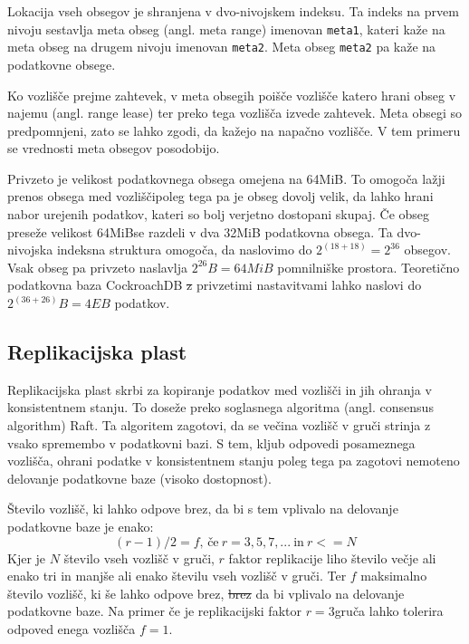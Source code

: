 \documentclass[a4paper, 12pt]{book}
\providecommand{\DIFaddtex}[1]{{\protect\color{blue}\uwave{#1}}} %
\providecommand{\DIFdeltex}[1]{{\protect\color{red}\sout{#1}}}                      %
\providecommand{\DIFaddbegin}{} %
\providecommand{\DIFaddend}{} %
\providecommand{\DIFdelbegin}{} %
\providecommand{\DIFdelend}{} %
\providecommand{\DIFadd}[1]{\texorpdfstring{\DIFaddtex{#1}}{#1}} %
\providecommand{\DIFdel}[1]{\texorpdfstring{\DIFdeltex{#1}}{}} %
\newcommand{\DIFscaledelfig}{0.5}
\newlength{\DIFdelgraphicswidth} %
\newlength{\DIFdelgraphicsheight} %
\newcommand{\DIFaddincludegraphics}[2][]{{\color{blue}\fbox{\DIFOincludegraphics[#1]{#2}}}} %
\newcommand{\DIFdelincludegraphics}[2][]{%
\sbox{\DIFdelgraphicsbox}{\DIFOincludegraphics[#1]{#2}}%
\settoboxwidth{\DIFdelgraphicswidth}{\DIFdelgraphicsbox} %
\settoboxtotalheight{\DIFdelgraphicsheight}{\DIFdelgraphicsbox} %
\scalebox{\DIFscaledelfig}{%
\parbox[b]{\DIFdelgraphicswidth}{\usebox{\DIFdelgraphicsbox}\\[-\baselineskip] \rule{\DIFdelgraphicswidth}{0em}}\llap{\resizebox{\DIFdelgraphicswidth}{\DIFdelgraphicsheight}{%
\setlength{\unitlength}{\DIFdelgraphicswidth}%
\begin{picture}(1,1)%
\thicklines\linethickness{2pt} %
{\color[rgb]{1,0,0}\put(0,0){\framebox(1,1){}}}%
{\color[rgb]{1,0,0}\put(0,0){\line( 1,1){1}}}%
{\color[rgb]{1,0,0}\put(0,1){\line(1,-1){1}}}%
\end{picture}%
}\hspace*{3pt}}} %
} %
\DeclareRobustCommand{\DIFaddbegin}{\DIFOaddbegin \let\includegraphics\DIFaddincludegraphics} %
\DeclareRobustCommand{\DIFaddend}{\DIFOaddend \let\includegraphics\DIFOincludegraphics} %
\DeclareRobustCommand{\DIFdelbegin}{\DIFOdelbegin \let\includegraphics\DIFdelincludegraphics} %
\DeclareRobustCommand{\DIFdelend}{\DIFOaddend \let\includegraphics\DIFOincludegraphics} %
\begin{document}
Lokacija vseh obsegov je shranjena v dvo-nivojskem indeksu. Ta indeks na prvem nivoju sestavlja meta obseg (angl. meta range) imenovan \texttt{meta1}, kateri kaže na meta obseg na drugem nivoju imenovan \texttt{meta2}. Meta obseg \texttt{meta2} pa kaže na podatkovne obsege.

Ko vozlišče prejme zahtevek, v meta obsegih poišče vozlišče katero hrani obseg v najemu (angl. range lease) ter preko tega vozlišča izvede zahtevek. Meta obsegi so predpomnjeni, zato se lahko zgodi, da kažejo na napačno vozlišče. V tem primeru se vrednosti meta obsegov posodobijo.

Privzeto je velikost podatkovnega obsega omejena na 64MiB. To omogoča lažji prenos obsega med vozlišči\DIFaddbegin \DIFadd{, }\DIFaddend poleg tega pa je obseg dovolj velik, da lahko hrani nabor urejenih podatkov, kateri so bolj verjetno dostopani skupaj. Če obseg preseže velikost 64MiB\DIFaddbegin \DIFadd{, }\DIFaddend se razdeli v dva 32MiB podatkovna obsega. Ta dvo-nivojska indeksna struktura omogoča, da naslovimo do \(2^{(18 + 18)} = 2^{36}\) obsegov. Vsak obseg pa privzeto naslavlja \(2^{26}B = 64MiB\) pomnilniške prostora. Teoretično podatkovna baza CockroachDB \DIFdelbegin \DIFdel{z }\DIFdelend \DIFaddbegin \DIFadd{s }\DIFaddend privzetimi nastavitvami lahko naslovi do \(2^{(36+26)}B = 4EB\) podatkov. 

\subsection{Replikacijska plast}

Replikacijska plast skrbi za kopiranje podatkov med vozlišči in jih ohranja v konsistentnem stanju. To doseže preko soglasnega algoritma (angl. consensus algorithm) Raft. Ta algoritem zagotovi, da se večina vozlišč v gruči strinja z vsako spremembo v podatkovni bazi. S tem, kljub odpovedi posameznega vozlišča, ohrani podatke v konsistentnem stanju poleg tega pa zagotovi nemoteno delovanje podatkovne baze (visoko dostopnost).

Število vozlišč, ki lahko odpove brez, da bi s tem vplivalo na delovanje podatkovne baze je enako:
\[(r - 1)/2 = f \text{, če}\ r = 3, 5, 7, ...\ \text{in}\ r <= N\]
Kjer je \(N\) število vseh vozlišč v gruči, \(r\) faktor replikacije liho število večje ali enako tri in manjše ali enako številu vseh vozlišč v gruči. Ter \(f\) maksimalno število vozlišč, ki še lahko odpove brez, \DIFdelbegin \DIFdel{brez }\DIFdelend da bi vplivalo na delovanje podatkovne baze. Na primer če je replikacijski faktor \(r = 3\)\DIFaddbegin \DIFadd{, }\DIFaddend gruča lahko tolerira odpoved enega vozlišča \(f = 1\).
\end{document}
